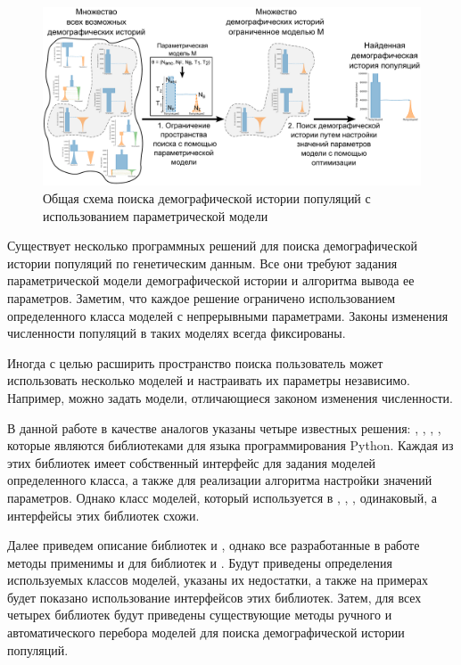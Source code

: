 \documentclass[a4paper,14pt,oneside,openany,article]{memoir}
\begin{document}
\begin{figure}[h]
    \centering
    \includegraphics[width=\textwidth]{images_2/scheme.pdf}
    \caption{Общая схема поиска демографической истории популяций с использованием параметрической модели}
    \label{fig:scheme}
\end{figure}

Существует несколько программных решений для поиска демографической истории популяций по генетическим данным. 
Все они требуют задания параметрической модели демографической истории и алгоритма вывода ее параметров.
Заметим, что каждое решение ограничено использованием определенного класса моделей с непрерывными параметрами.
Законы изменения численности популяций в таких моделях всегда фиксированы.

Иногда с целью расширить пространство поиска пользователь может использовать несколько моделей и настраивать их параметры независимо.
Например, можно задать модели, отличающиеся законом изменения численности.

В данной работе в качестве аналогов указаны четыре известных решения: \dadi, \moments, \momentsLD, \momi, которые являются библиотеками для языка программирования Python.
Каждая из этих библиотек имеет собственный интерфейс для задания моделей определенного класса, а также для реализации алгоритма настройки значений параметров.
Однако класс моделей, который используется в \dadi, \moments, \momentsLD, одинаковый, а интерфейсы этих библиотек схожи.

Далее приведем описание библиотек \dadi и \momi, однако все разработанные в работе методы применимы и для библиотек \moments и \momentsLD.
Будут приведены определения используемых классов моделей, указаны их недостатки, а также на примерах будет показано использование интерфейсов этих библиотек.
Затем, для всех четырех библиотек будут приведены существующие методы ручного и автоматического перебора моделей для поиска демографической истории популяций.\\
\end{document}
